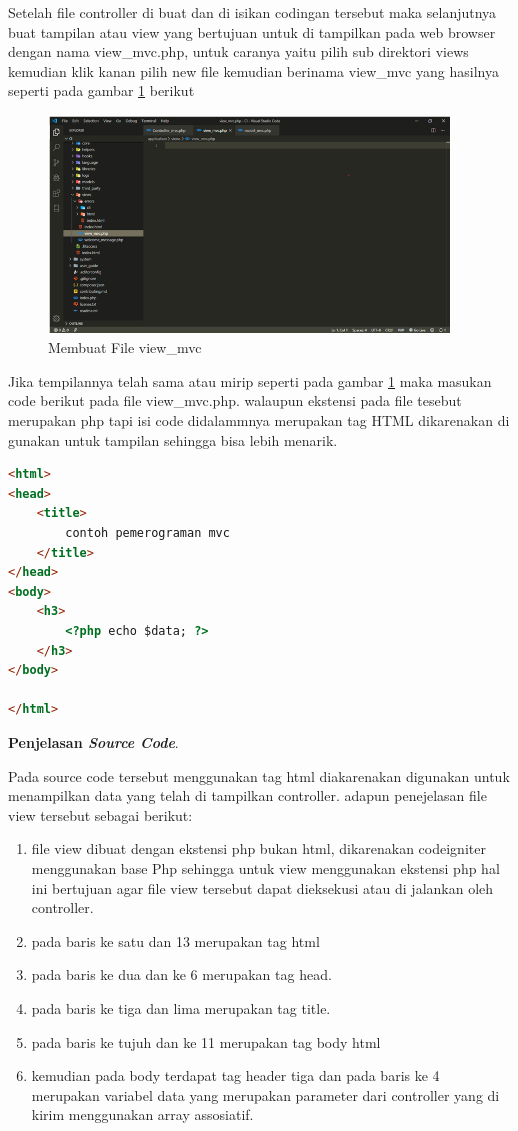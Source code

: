 Setelah file controller di buat dan di isikan codingan tersebut maka selanjutnya buat tampilan atau view yang bertujuan untuk di tampilkan pada web browser dengan nama view\_mvc.php, untuk caranya yaitu pilih sub direktori views kemudian klik kanan pilih new file kemudian berinama view\_mvc yang hasilnya seperti pada gambar \ref{mvc6} berikut

\begin{figure}[h]
	\centerline{\includegraphics[width=0.95\textwidth]{figures/MVC/6.png}}
	\caption{Membuat File view\_mvc}
	\label{mvc6}
\end{figure}

Jika tempilannya telah sama atau mirip seperti pada gambar \ref{mvc6} maka masukan code berikut pada file view\_mvc.php. walaupun ekstensi pada file tesebut merupakan php tapi isi code didalammnya merupakan tag HTML dikarenakan di gunakan untuk tampilan sehingga bisa lebih menarik.
\begin{lstlisting}[language=HTML]
<html>
<head>
    <title>
        contoh pemerograman mvc
    </title>
</head>
<body>
    <h3>
        <?php echo $data; ?>
    </h3>
</body>

</html>
\end{lstlisting}
\pagebreak
\textbf{Penjelasan \textit{Source Code}}.\par

Pada source code tersebut menggunakan tag html diakarenakan digunakan untuk menampilkan data yang telah di tampilkan controller. adapun penejelasan file view tersebut sebagai berikut:
\begin{enumerate}
\item file view dibuat dengan ekstensi php bukan html, dikarenakan codeigniter menggunakan base Php sehingga untuk view menggunakan ekstensi php hal ini bertujuan agar file view tersebut dapat dieksekusi atau di jalankan oleh controller.
\item pada baris ke satu dan 13 merupakan tag html
\item pada baris ke dua dan ke 6 merupakan tag head.
\item pada baris ke tiga dan lima merupakan tag title.
\item pada baris ke tujuh dan ke 11 merupakan tag body html 
\item kemudian pada body terdapat tag header tiga dan pada baris ke 4 merupakan variabel data yang merupakan parameter dari controller yang di kirim menggunakan array assosiatif. 
\end{enumerate}

